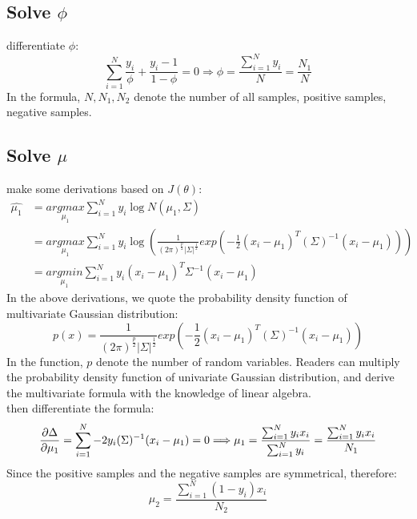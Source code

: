 \documentclass{report}
\begin{document}
\subsection{Solve $\phi$}
differentiate $\phi$:
$$
\sum_{i=1}^{N} \frac{y_{i}}{\phi}+\frac{y_{i}-1}{1-\phi}=0
\Longrightarrow \phi=\frac{\sum_{i=1}^{N} y_{i}}{N}=\frac{N_{1}}{N}
$$
In the formula, $N,N_1,N_2$ denote the number of all samples, positive samples, negative samples.
\subsection{Solve $\mu$}
make some derivations based on $J(\theta)$:
$$
\begin{aligned} \hat{\mu_{1}} 
&=\underset{\mu_{1}}{argmax} \sum_{i=1}^{N} y_{i} \log N\left(\mu_{1}, \Sigma\right) \\
&=\underset{\mu_1}{argmax} \sum_{i=1}^{N} y_i \log (\frac{1}{(2\pi)^{\frac{p}{2}}|\Sigma|^{\frac{1}{2}}}exp(-\frac{1}{2}(x_i-\mu_1)^T(\Sigma)^{-1}(x_i-\mu_1)))\\
&=\underset{\mu_{1}}{argmin} \sum_{i=1}^{N} y_{i}\left(x_{i}-\mu_{1}\right)^{T} \Sigma^{-1}\left(x_{i}-\mu_{1}\right)
\end{aligned}
$$
In the above derivations, we quote the probability density function of multivariate Gaussian distribution:
$$
p(x)=\frac{1}{(2\pi)^{\frac{p}{2}}|\Sigma|^{\frac{1}{2}}}exp(-\frac{1}{2}(x_i-\mu_1)^T(\Sigma)^{-1}(x_i-\mu_1))
$$
In the function, $p$ denote the number of random variables. Readers can multiply the probability density function of univariate Gaussian distribution, and derive the multivariate formula with the knowledge of linear algebra.\\
then differentiate the formula:
$$
\frac{\partial \Delta}{\partial \mu_1}=\sum_{i=1}^N -2y_i (\Sigma)^{-1}(x_i-\mu_1)=0\\
\Longrightarrow \mu_{1}=\frac{\sum_{i=1}^{N} y_{i} x_{i}}{\sum_{i=1}^{N} y_{i}}=\frac{\sum_{i=1}^{N} y_{i} x_{i}}{N_{1}}
$$
Since the positive samples and the negative samples are symmetrical, therefore:
$$
\mu_{2}=\frac{\sum_{i=1}^{N}\left(1-y_{i}\right) x_{i}}{N_{2}}
$$
\end{document}
